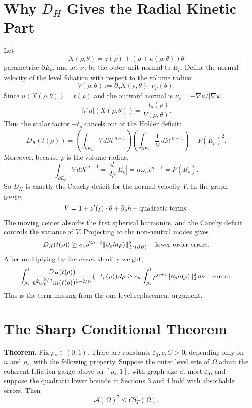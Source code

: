 \documentclass[11pt]{article}
\begin{document}
\section{Why \(D_H\) Gives the Radial Kinetic Part}

Let
\[
X(\rho,\theta)=z(\rho)+(\rho+h(\rho,\theta))\theta
\]
parametrize \(\partial E_\rho\), and let \(\nu_\rho\) be the outer unit normal
to \(E_\rho\). Define the normal velocity of the level foliation with respect
to the volume radius:
\[
V(\rho,\theta):=\partial_\rho X(\rho,\theta)\cdot\nu_\rho(\theta).
\]
Since \(u(X(\rho,\theta))=t(\rho)\) and the outward normal is
\(\nu_\rho=-\nabla u/|\nabla u|\),
\[
|\nabla u|(X(\rho,\theta))
=
\frac{-t_\rho(\rho)}{V(\rho,\theta)}.
\]
Thus the scalar factor \(-t_\rho\) cancels out of the Holder deficit:
\[
D_H(t(\rho))
=
\left(\int_{\partial E_\rho}V\,d\mathcal H^{n-1}\right)
\left(\int_{\partial E_\rho}\frac1V\,d\mathcal H^{n-1}\right)
-P(E_\rho)^2.
\]
Moreover, because \(\rho\) is the volume radius,
\[
\int_{\partial E_\rho}V\,d\mathcal H^{n-1}
=
\frac{d}{d\rho}|E_\rho|
=
n\omega_n\rho^{n-1}
=P(B_\rho).
\]
So \(D_H\) is exactly the Cauchy deficit for the normal velocity \(V\). In the
graph gauge,
\[
V=1+z'(\rho)\cdot\theta+\partial_\rho h+\hbox{quadratic terms}.
\]
The moving center absorbs the first spherical harmonics, and the Cauchy deficit
controls the variance of \(V\). Projecting to the non-neutral modes gives
\[
D_H(t(\rho))
\ge
c_n\rho^{2n-2}
\|\partial_\rho h(\rho)\|_{L^2(\partial B)}^2
-\hbox{lower order errors}.
\]
After multiplying by the exact identity weight,
\[
\int_{\rho_*}^1
\frac{D_H(t(\rho))}
{n^2\omega_n^{2/n}m(t(\rho))^{1-2/n}}
(-t_\rho(\rho))\,d\rho
\ge
c_n
\int_{\rho_*}^1
\rho^{n+1}\|\partial_\rho h(\rho)\|_2^2\,d\rho
-\hbox{errors}.
\]
This is the term missing from the one-level replacement argument.

\section{The Sharp Conditional Theorem}

\textbf{Theorem.}
Fix \(\rho_*\in(0,1)\). There are constants
\(\varepsilon_0,c,C>0\), depending only on \(n\) and \(\rho_*\), with the
following property. Suppose the outer level sets of \(\Omega\) admit the
coherent foliation gauge above on \([\rho_*,1]\), with graph size at most
\(\varepsilon_0\), and suppose the quadratic lower bounds in Sections 3 and 4
hold with absorbable errors. Then
\[
\mathcal A(\Omega)^2\le C\delta_T(\Omega).
\]
\end{document}
